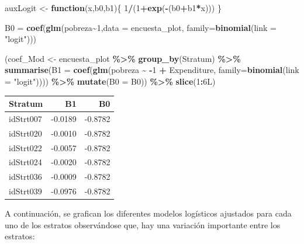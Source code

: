 \documentclass[
  spanish,
  12pt,
]{book}
\newenvironment{Shaded}{\begin{snugshade}}{\end{snugshade}}
\newcommand{\AttributeTok}[1]{\textcolor[rgb]{0.13,0.29,0.53}{#1}}
\newcommand{\ControlFlowTok}[1]{\textcolor[rgb]{0.13,0.29,0.53}{\textbf{#1}}}
\newcommand{\DataTypeTok}[1]{\textcolor[rgb]{0.13,0.29,0.53}{#1}}
\newcommand{\DecValTok}[1]{\textcolor[rgb]{0.00,0.00,0.81}{#1}}
\newcommand{\FunctionTok}[1]{\textcolor[rgb]{0.13,0.29,0.53}{\textbf{#1}}}
\newcommand{\NormalTok}[1]{#1}
\newcommand{\OtherTok}[1]{\textcolor[rgb]{0.56,0.35,0.01}{#1}}
\newcommand{\SpecialCharTok}[1]{\textcolor[rgb]{0.81,0.36,0.00}{\textbf{#1}}}
\newcommand{\StringTok}[1]{\textcolor[rgb]{0.31,0.60,0.02}{#1}}
\begin{document}
\begin{Shaded}
\begin{Highlighting}[]
\NormalTok{auxLogit }\OtherTok{\textless{}{-}} \ControlFlowTok{function}\NormalTok{(x,b0,b1)\{}
  \DecValTok{1}\SpecialCharTok{/}\NormalTok{(}\DecValTok{1}\SpecialCharTok{+}\FunctionTok{exp}\NormalTok{(}\SpecialCharTok{{-}}\NormalTok{(b0}\SpecialCharTok{+}\NormalTok{b1}\SpecialCharTok{*}\NormalTok{x)))}
\NormalTok{\}}

\NormalTok{B0 }\OtherTok{=} \FunctionTok{coef}\NormalTok{(}\FunctionTok{glm}\NormalTok{(pobreza}\SpecialCharTok{\textasciitilde{}}\DecValTok{1}\NormalTok{,}\AttributeTok{data =}\NormalTok{ encuesta\_plot,}
     \AttributeTok{family=}\FunctionTok{binomial}\NormalTok{(}\AttributeTok{link =} \StringTok{"logit"}\NormalTok{)))}

\NormalTok{(coef\_Mod }\OtherTok{\textless{}{-}}\NormalTok{ encuesta\_plot }\SpecialCharTok{\%\textgreater{}\%} \FunctionTok{group\_by}\NormalTok{(Stratum) }\SpecialCharTok{\%\textgreater{}\%} 
  \FunctionTok{summarise}\NormalTok{(}\AttributeTok{B1 =} \FunctionTok{coef}\NormalTok{(}\FunctionTok{glm}\NormalTok{(pobreza }\SpecialCharTok{\textasciitilde{}}  \SpecialCharTok{{-}}\DecValTok{1} \SpecialCharTok{+}\NormalTok{ Expenditure,}
              \AttributeTok{family=}\FunctionTok{binomial}\NormalTok{(}\AttributeTok{link =} \StringTok{"logit"}\NormalTok{)))) }\SpecialCharTok{\%\textgreater{}\%} 
\FunctionTok{mutate}\NormalTok{(}\AttributeTok{B0 =}\NormalTok{ B0)) }\SpecialCharTok{\%\textgreater{}\%} \FunctionTok{slice}\NormalTok{(}\DecValTok{1}\SpecialCharTok{:}\DecValTok{6}\DataTypeTok{L}\NormalTok{)}
\end{Highlighting}
\end{Shaded}

\begin{tabular}{l|r|r}
\hline
Stratum & B1 & B0\\
\hline
idStrt007 & -0.0189 & -0.8782\\
\hline
idStrt020 & -0.0010 & -0.8782\\
\hline
idStrt022 & -0.0057 & -0.8782\\
\hline
idStrt024 & -0.0020 & -0.8782\\
\hline
idStrt036 & -0.0009 & -0.8782\\
\hline
idStrt039 & -0.0976 & -0.8782\\
\hline
\end{tabular}

A continuación, se grafican los diferentes modelos logísticos ajustados para cada uno de los estratos observándose que, hay una variación importante entre los estratos:
\end{document}
